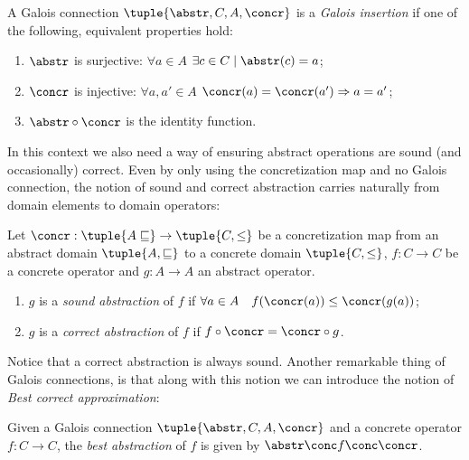 \begin{definition}
  A Galois connection \(\tuple{\abstr, C, A, \concr}\) is a
  \emph{Galois insertion} if one of the following, equivalent
  properties hold:
  \begin{enumerate}
  \item \(\abstr\) is surjective: \(\forall a \in A\)
    \(\exists c \in C \mid \abstr(c) = a\);
  \item \(\concr\) is injective: \(\forall a, a'\in A\)
    \(\concr(a) = \concr(a') \Rightarrow a = a'\);
  \item \(\abstr \circ \concr\) is the identity function.
  \end{enumerate}
\end{definition}

In this context we also need a way of ensuring abstract operations are
sound (and occasionally) correct. Even by only using the
concretization map and no Galois connection, the notion of sound and
correct abstraction carries naturally from domain elements to domain
operators:

\begin{definition}
  Let \(\concr : \tuple{A \sqsubseteq} \to \tuple{C, \leq}\) be a
  concretization map from an abstract domain
  \(\tuple{A, \sqsubseteq}\) to a concrete domain \(\tuple{C, \leq}\),
  \(f : C \to C\) be a concrete operator and \(g : A \to A\) an
  abstract operator.
  \begin{enumerate}
  \item \(g\) is a \emph{sound abstraction} of \(f\) if
    \(\forall a \in A \quad f(\concr(a)) \leq \concr(g(a))\);
  \item \(g\) is a \emph{correct abstraction} of \(f\) if
    \(f \circ \concr = \concr \circ g\).
  \end{enumerate}
\end{definition}

Notice that a correct abstraction is always sound.  Another remarkable
thing of Galois connections, is that along with this notion we can
introduce the notion of \emph{Best correct approximation}:

\begin{definition}
  Given a Galois connection \(\tuple{\abstr, C, A, \concr}\) and a
  concrete operator \(f : C \to C\), the \emph{best abstraction} of
  \(f\) is given by \(\abstr \conc f \conc \concr\).
\end{definition}

